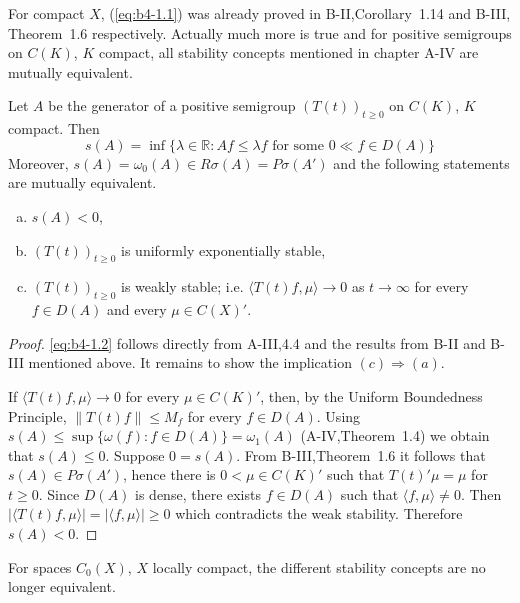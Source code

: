 For compact $X$, (\ref{eq:b4-1.1}) was already proved in B-II,Corollary~1.14 and B-III, Theorem~1.6 respectively. Actually much more is true and for positive semigroups on $C(K)$, $K$ compact, all stability concepts mentioned in chapter A-IV are mutually equivalent.

\begin{theorem}\label{thm:b4-1.1}
Let $A$ be the generator of a positive semigroup $(T(t))_{t \geq 0}$ on $C(K)$, $K$ compact. Then
\begin{equation}\label{eq:b4-1.2}
   s(A) = \inf \{\lambda \in \mathbb{R} \colon Af \leq \lambda f \text{ for some } 0 \ll f \in D(A)\}
\end{equation}
Moreover, $s(A) = \omega_{0}(A) \in R\sigma(A) = P\sigma(A')$ and the following statements are mutually equivalent.
\begin{enumerate}[(a)]
\item $s(A) < 0$,
\item $(T(t))_{t \geq 0}$ is uniformly exponentially stable,
\item $(T(t))_{t \geq 0}$ is weakly stable; i.e. $\langle T(t)f,\mu \rangle \to 0$ as $t \to \infty$ for every $f \in D(A)$ and every $\mu \in C(X)'$.
\end{enumerate}
\end{theorem}
\begin{proof}
\eqref{eq:b4-1.2} follows directly from A-III,4.4 and the results from B-II and B-III mentioned above. It remains to show the implication $(c) \Rightarrow (a)$.

If $\langle T(t)f,\mu \rangle \to 0$ for every $\mu \in C(K)'$, then, by the Uniform Boundedness Principle, $\|T(t)f\| \leq M_f$ for every $f \in D(A)$.
Using $s(A) \leq \sup \{\omega(f)\colon f \in D(A)\} = \omega_1(A)$ (A-IV,Theorem~1.4) we obtain that $s(A) \leq 0$. 
Suppose $0 = s(A)$. 
From B-III,Theorem~1.6 it follows that $s(A) \in P\sigma(A')$, hence there is $0 < \mu \in C(K)'$ such that $T(t)'\mu = \mu$ for $t \geq 0$. 
Since $D(A)$ is dense, there exists $f \in D(A)$ such that $\langle f,\mu \rangle \neq 0$. 
Then $|\langle T(t)f,\mu \rangle| = |\langle f,\mu \rangle|  \ge  0$ which contradicts the weak stability. Therefore $s(A) < 0$.
\end{proof}
For spaces $C_{0}(X)$, $X$ locally compact, the different stability concepts are no longer equivalent.
%
%
%
%
\newpage
